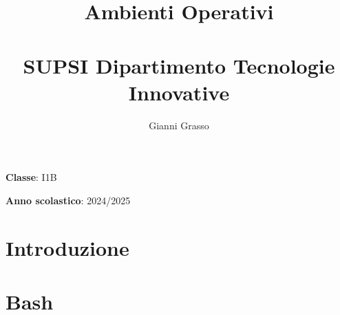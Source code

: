 \documentclass{article}
\title{
    Ambienti Operativi \\
    \phantom{}\\
    \large SUPSI Dipartimento Tecnologie Innovative
}
\author{Gianni Grasso}
\begin{document}
\maketitle
\hphantom{ }
\vspace{14.5cm}

\textbf{Classe}: I1B

\textbf{Anno scolastico}: 2024/2025
\pagebreak


\tableofcontents
\pagebreak

\section{Introduzione}

\pagebreak


\section{Bash}

\pagebreak


%

%


\end{document}
